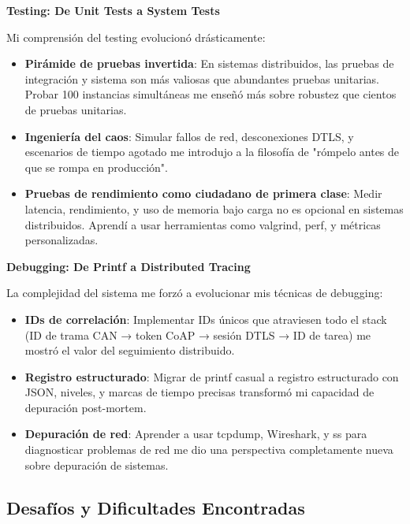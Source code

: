 \textbf{Testing: De Unit Tests a System Tests}

Mi comprensión del testing evolucionó drásticamente:

\begin{itemize}
    \item \textbf{Pirámide de pruebas invertida}: En sistemas distribuidos, las pruebas de integración y sistema son más valiosas que abundantes pruebas unitarias. Probar 100 instancias simultáneas me enseñó más sobre robustez que cientos de pruebas unitarias.
    
    \item \textbf{Ingeniería del caos}: Simular fallos de red, desconexiones DTLS, y escenarios de tiempo agotado me introdujo a la filosofía de "rómpelo antes de que se rompa en producción".
    
    \item \textbf{Pruebas de rendimiento como ciudadano de primera clase}: Medir latencia, rendimiento, y uso de memoria bajo carga no es opcional en sistemas distribuidos. Aprendí a usar herramientas como valgrind, perf, y métricas personalizadas.
\end{itemize}

\textbf{Debugging: De Printf a Distributed Tracing}

La complejidad del sistema me forzó a evolucionar mis técnicas de debugging:

\begin{itemize}
    \item \textbf{IDs de correlación}: Implementar IDs únicos que atraviesen todo el stack (ID de trama CAN → token CoAP → sesión DTLS → ID de tarea) me mostró el valor del seguimiento distribuido.
    
    \item \textbf{Registro estructurado}: Migrar de printf casual a registro estructurado con JSON, niveles, y marcas de tiempo precisas transformó mi capacidad de depuración post-mortem.
    
    \item \textbf{Depuración de red}: Aprender a usar tcpdump, Wireshark, y ss para diagnosticar problemas de red me dio una perspectiva completamente nueva sobre depuración de sistemas.
\end{itemize}

\subsection{Desafíos y Dificultades Encontradas}

